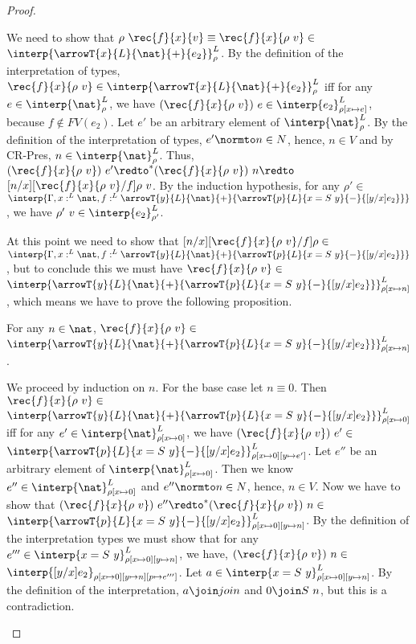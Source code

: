 \begin{proof}
\begin{itemize}
    We need to show that $\rho\ \rec{f}{x}{v} \equiv \rec{f}{x}{\rho\ v} \in $
    $\interp{\arrowT{x}{L}{\nat}{+}{e_2}}^L_\rho$.  By the
    definition of the interpretation of types, $\rec{f}{x}{\rho\ v}
    \in \interp{\arrowT{x}{L}{\nat}{+}{e_2}}^L_\rho$ iff for any $e
    \in \interp{\nat}^L_\rho$, we have $(\rec{f}{x}{\rho\ v})\ e
    \in \interp{e_2}^L_{\rho[x \mapsto e]}$, because $f \not \in FV(e_2)$.
    Let $e'$ be an arbitrary element of 
    $\interp{\nat}^L_\rho$.  By the definition of the interpretation of types,
    $e' \normto n \in N$, hence, $n \in V$ and by CR-Pres, $n \in
    \interp{\nat}^L_\rho$.  Thus, $(\rec{f}{x}{\rho\ v})\ e'
    \redto^* (\rec{f}{x}{\rho\ v})\ n \redto $
    $[n/x][\rec{f}{x}{\rho\ v}/f]\rho\ v$.  By the induction
    hypothesis, for any $\rho' \in $ $\interp{\Gamma,x:^L \nat,f:^L
    \arrowT{y}{L}{\nat}{+}{\arrowT{p}{L}{x = S\ y}{-}{[y/x]e_2}}}$,
    we have $\rho'\ v \in \interp{e_2}^L_{\rho'}$.

    \noindent
    At this point we need to show that
    $[n/x][\rec{f}{x}{\rho\ v}/f]\rho \in $ $\interp{\Gamma,x:^L
    \nat,f:^L \arrowT{y}{L}{\nat}{+}{\arrowT{p}{L}{x =
    S\ y}{-}{[y/x]e_2}}}$, but to conclude this we must have
    $\rec{f}{x}{\rho\ v} \in $
    $\interp{\arrowT{y}{L}{\nat}{+}{\arrowT{p}{L}{x =
    S\ y}{-}{[y/x]e_2}}}^L_{\rho[x \mapsto n]}$, which means
    we have to prove the following proposition.

  \noindent
  
  \begin{proposition}
    \label{prop:rec_interp_proof}
    For any $n \in \nat$, $\rec{f}{x}{\rho\ v} \in $
    $\interp{\arrowT{y}{L}{\nat}{+}{\arrowT{p}{L}{x=S\ y}{-}{[y/x]e_2}}}^L_{\rho[x \mapsto n]}$.
  \end{proposition}
  
  \noindent
  We proceed by induction on $n$.  For the base case let $n \equiv 0$.
  Then $\rec{f}{x}{\rho\ v} \in $
  $\interp{\arrowT{y}{L}{\nat}{+}{\arrowT{p}{L}{x =
  S\ y}{-}{[y/x]e_2}}}^L_{\rho[x \mapsto 0]}$ iff for any $e'
  \in \interp{\nat}^L_{\rho[x \mapsto 0]}$, we have
  $(\rec{f}{x}{\rho\ v})\ e' \in $ $\interp{\arrowT{p}{L}{x =
  S\ y}{-}{[y/x]e_2}}^L_{\rho[x \mapsto 0][y \mapsto e']}$.
  Let $e''$ be an arbitrary element of $\interp{\nat}^L_{\rho[x \mapsto 0]}$.  Then we know 
  $e'' \in \interp{\nat}^L_{\rho[x
  \mapsto 0]}$ and $e'' \normto n \in N$, hence, $n \in V$.  Now
  we have to show that $(\rec{f}{x}{\rho\ v})\ e'' \redto^*
  (\rec{f}{x}{\rho\ v})\ n\in $ $\interp{\arrowT{p}{L}{x =
  S\ y}{-}{[y/x]e_2}}^L_{\rho[x \mapsto 0][y \mapsto n]}$.  By
  the definition of the interpretation types we must show that for any
  $e''' \in \interp{x = S\ y}^L_{\rho[x \mapsto 0][y \mapsto n]}$, we
  have, $(\rec{f}{x}{\rho\ v})\ n \in $ $\interp{[y/x]e_2}_{\rho[x
  \mapsto 0][y \mapsto n][p \mapsto e''']}$.  Let 
  $a \in \interp{x = S\ y}^L_{\rho[x \mapsto 0][y \mapsto n]}$.
  By the definition of the interpretation, $a \join join$ and $0
  \join S\ n$, but this is a contradiction.


\end{itemize}
\end{proof}
